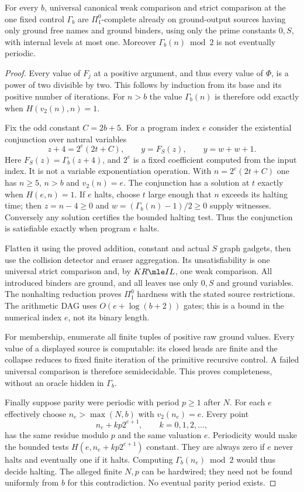 \begin{theorem}\label{thm:control-hardness}
For every $b$, universal canonical weak comparison and strict comparison
at the one fixed control $\Gamma_b$ are $\Pi^0_1$-complete already on
ground-output sources having only ground free names and ground binders,
using only the prime constants $0,S$, with internal levels at most one.
Moreover $\Gamma_b(n)\bmod2$ is not eventually periodic.
\end{theorem}
\begin{proof}
Every value of $F_j$ at a positive argument, and thus every value of
$\Phi$, is a power of two divisible by two.  This follows by induction
from its base and its positive number of iterations.
For $n>b$ the value $\Gamma_b(n)$ is therefore odd exactly when
$H(v_2(n),n)=1$.

Fix the odd constant $C=2b+5$.  For a program index $e$ consider the
existential conjunction over natural variables
\[
 z+4=2^e(2t+C),\qquad y=F_S(z),\qquad y=w+w+1.
\]
Here $F_S(z)=\Gamma_b(z+4)$, and $2^e$ is a fixed coefficient computed
from the input index.  It is not a variable exponentiation operation.
With $n=2^e(2t+C)$ one has $n\ge5$, $n>b$ and $v_2(n)=e$.
The conjunction has a solution at $t$ exactly when $H(e,n)=1$.
If $e$ halts, choose $t$ large enough that $n$ exceeds its halting time;
then $z=n-4\ge0$ and $w=(\Gamma_b(n)-1)/2\ge0$ supply witnesses.
Conversely any solution certifies the bounded halting test.  Thus the
conjunction is satisfiable exactly when program $e$ halts.

Flatten it using the proved addition, constant and actual $S$ graph gadgets,
then use the collision detector and eraser aggregation.  Its unsatisfiability
is one universal strict comparison and, by $KR\mle IL$, one weak comparison.
All introduced binders are ground, and all leaves use only $0,S$ and ground
variables.  The nonhalting reduction proves $\Pi^0_1$ hardness with the stated
source restrictions.  The arithmetic DAG uses $O(e+\log(b+2))$ gates;
this is a bound in the numerical index $e$, not its binary length.

For membership, enumerate all finite tuples of positive raw ground values.
Every value of a displayed source is computable: its closed heads are finite
and the collapse reduces to fixed finite iteration of the primitive recursive
control.  A failed universal comparison is therefore semidecidable.
This proves completeness, without an oracle hidden in $\Gamma_b$.

Finally suppose parity were periodic with period $p\ge1$ after $N$.
For each $e$ effectively choose $n_e>\max(N,b)$ with $v_2(n_e)=e$.
Every point
\[
 n_e+k p2^{e+1},\qquad k=0,1,2,\ldots,
\]
has the same residue modulo $p$ and the same valuation $e$.
Periodicity would make the bounded tests $H(e,n_e+kp2^{e+1})$ constant.
They are always zero if $e$ never halts and eventually one if it halts.
Computing $\Gamma_b(n_e)\bmod2$ would thus decide halting.
The alleged finite $N,p$ can be hardwired; they need not be found uniformly
from $b$ for this contradiction.  No eventual parity period exists.
\end{proof}

